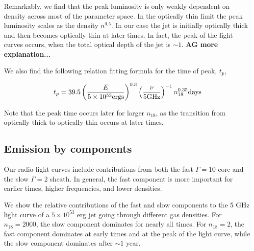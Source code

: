 \documentclass[usenatbib,fleqn]{mnras}
\begin{document}
Remarkably, we find that the peak luminosity is only weakly dependent
on density across most of the parameter space. In the optically thin
limit the peak luminosity scales as the density $n^{0.5}$. In our case the
jet is initially optically thick and then becomes optically thin at
later times. In fact, the peak of the light curves occurs, when the total
optical depth of the jet is $\sim 1$. {\bf AG more explanation...}


We also find the following relation fitting formula for the time of
peak, $t_p$, 

\begin{equation}
t_p = 39.5 \left(\frac{E}{5 \times 10^{53} {\rm ergs}}\right)^{0.3} 
\left(\frac{\nu}{5 {\rm GHz}}\right)^{-1} n_{18}^{0.35} {\rm days}
\label{eq:peakTime}
\end{equation}

Note that the peak time occurs later for larger $n_{18}$, as the
transition from optically thick to optically thin occurs at later times.

\subsection{Emission by components}
Our radio light curves include contributions from both the fast
$\Gamma=10$ core and the slow $\Gamma=2$ sheath. In general, the fast
component is more important for earlier times, higher frequencies, and
lower densities. 

We show the relative contributions of the fast and slow components to
the 5 GHz light curve of a $5 \times 10^{53}$ erg jet going through
different gas densities. For $n_{18}=2000$, the slow component
dominates for nearly all times.  For $n_{18}=2$, the fast component
dominates at early times and at the peak of the light curve, while the
slow component dominates after $\sim$1 year.
\end{document}
